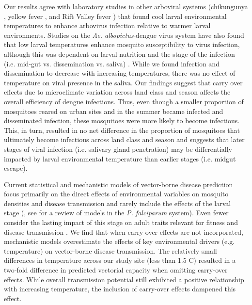 \documentclass[12pt]{article}
\begin{document}
Our results agree with laboratory studies in other arboviral systems (chikungunya \citep{westbrook2010, adelman2013}, yellow fever \citep{adelman2013}, and Rift Valley fever \citep{turell1993}) that found cool larval environmental temperatures to enhance arbovirus infection relative to warmer larval environments. Studies on the \textit{Ae. albopictus}-dengue virus system have also found that low larval temperatures enhance mosquito susceptibility to virus infection, although this was dependent on larval nutrition \citep{buckner2016} and the stage of the infection (i.e. mid-gut vs. dissemination vs. saliva) \citep{alto2013}. While we found infection and dissemination to decrease with increasing temperatures, there was no effect of temperature on viral presence in the saliva. Our findings suggest that carry over effects due to microclimate variation across land class and season affects the overall efficiency of dengue infections. Thus, even though a smaller proportion of mosquitoes reared on urban sites and in the summer became infected and disseminated infection, these mosquitoes were more likely to become infectious. This, in turn, resulted in no net difference in the proportion of mosquitoes that ultimately become infectious across land class and season and suggests that later stages of viral infection (i.e. salivary gland penetration) may be differentially impacted by larval environmental temperature than earlier stages (i.e. midgut escape).

Current statistical and mechanistic models of vector-borne disease prediction focus primarily on the direct effects of environmental variables on mosquito densities and disease transmission and rarely include the effects of the larval stage (\citealt{mordecai2017}, see \citealt{reiner2015} for a review of models in the \textit{P. falciparum} system). Even fewer consider the lasting impact of this stage on adult traits relevant for fitness and disease transmission \citep{ezeakacha2015}. We find that when carry over effects are not incorporated, mechanistic models overestimate the effects of key environmental drivers (e.g. temperature) on vector-borne disease transmission. The relatively small differences in temperature across our study site (less than 1.5 \degree C) resulted in a two-fold difference in predicted vectorial capacity when omitting carry-over effects. While overall transmission potential still exhibited a positive relationship with increasing temperature, the inclusion of carry-over effects dampened this effect.
\end{document}
